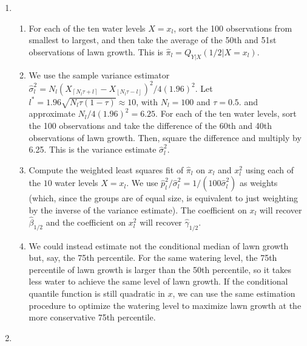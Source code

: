 \documentclass{article}
\begin{document}
\begin{enumerate}
\begin{enumerate}
	\end{enumerate}

	\item

	\begin{enumerate}

		\item

		For each of the ten water levels $X=x_l$, sort the 100 observations from smallest to largest, and then take the average of the 50th and 51st observations of lawn growth. This is $\hat{\pi}_l = Q_{Y|X}(1/2 | X=x_l)$.

		\item

		We use the sample variance estimator $\hat{\sigma}_l^2 = N_l(X_{\left\lceil N_l \tau + l \right\rceil} - X_{\left\lfloor N_l \tau - l \right\rfloor})^2 / 4(1.96)^2$. Let $l^* = 1.96 \sqrt{N_l \tau (1-\tau)} \approx 10$, with $N_l = 100$ and $\tau = 0.5$. and approximate $N_l/4(1.96)^2 = 6.25$. For each of the ten water levels, sort the 100 observations and take the difference of the 60th and 40th observations of lawn growth. Then, square the difference and multiply by 6.25. This is the variance estimate $\hat{\sigma}_l^2$.

		\item

		Compute the weighted least squares fit of $\hat{\pi}_l$ on $x_l$ and $x^2_l$ using each of the $10$ water levels $X = x_l$. We use $\hat{p}_l^2/\hat{\sigma}_l^2 = 1/(100 \hat{\sigma}_l^2)$ as weights (which, since the groups are of equal size, is equivalent to just weighting by the inverse of the variance estimate). The coefficient on $x_l$ will recover $\hat{\beta}_{1/2}$ and the coefficient on $x_l^2$ will recover $
	 	\hat{\gamma}_{1/2}$.

	 	\item 

	 	We could instead estimate not the conditional median of lawn growth but, say, the 75th percentile. For the same watering level, the 75th percentile of lawn growth is larger than the 50th percentile, so it takes less water to achieve the same level of lawn growth. If the conditional quantile function is still quadratic in $x$, we can use the same estimation procedure to optimize the watering level to maximize lawn growth at the more conservative 75th percentile.

	\end{enumerate}

	\item


\end{enumerate}
\end{document}
